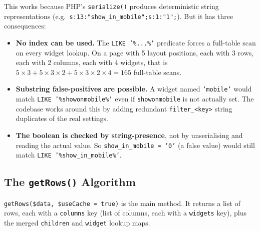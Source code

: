 \documentclass[11pt,a4paper]{article}
\begin{document}
This works because PHP's \texttt{serialize()} produces deterministic
string representations (e.g.\
\texttt{s:13:"show\_in\_mobile";s:1:"1";}). But it has three
consequences:

\begin{itemize}[leftmargin=1.6em,itemsep=2pt]
  \item \textbf{No index can be used.} The \texttt{LIKE '\%...\%'}
        predicate forces a full-table scan on every widget lookup.
        On a page with 5 layout positions, each with 3 rows, each
        with 2 columns, each with 4 widgets, that is
        $5 \times 3 + 5 \times 3 \times 2 + 5 \times 3 \times 2 \times 4 = 165$
        full-table scans.
  \item \textbf{Substring false-positives are possible.} A widget
        named \texttt{'mobile'} would match
        \texttt{LIKE '\%showonmobile\%'} even if
        \texttt{showonmobile} is not actually set. The codebase
        works around this by adding redundant
        \texttt{filter\_<key>} string duplicates of the real
        settings.
  \item \textbf{The boolean is checked by string-presence}, not by
        unserialising and reading the actual value. So
        \texttt{show\_in\_mobile = '0'} (a false value) would still
        match \texttt{LIKE '\%show\_in\_mobile\%'}.
\end{itemize}

\subsection{The \texttt{getRows()} Algorithm}

\texttt{getRows(\$data, \$useCache = true)} is the main method. It
returns a list of rows, each with a \texttt{columns} key (list of
columns, each with a \texttt{widgets} key), plus the merged
\texttt{children} and \texttt{widget} lookup maps.
\end{document}
